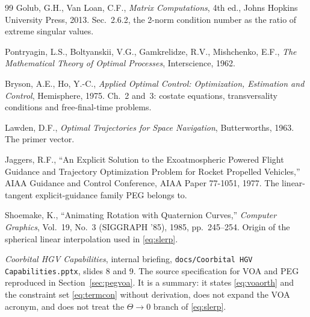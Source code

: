 \documentclass[11pt]{article}
\newcommand{\code}[1]{\texttt{#1}}
\begin{document}
\begin{thebibliography}{99}
Golub, G.H., Van Loan, C.F.,
\emph{Matrix Computations}, 4th ed., Johns Hopkins University Press, 2013.
Sec.~2.6.2, the 2-norm condition number as the ratio of extreme singular
values.

Pontryagin, L.S., Boltyanskii, V.G., Gamkrelidze, R.V., Mishchenko, E.F.,
\emph{The Mathematical Theory of Optimal Processes},
Interscience, 1962.

Bryson, A.E., Ho, Y.-C.,
\emph{Applied Optimal Control: Optimization, Estimation and Control},
Hemisphere, 1975. Ch.~2 and~3: costate equations, transversality conditions and
free-final-time problems.

Lawden, D.F.,
\emph{Optimal Trajectories for Space Navigation},
Butterworths, 1963. The primer vector.

Jaggers, R.F.,
``An Explicit Solution to the Exoatmospheric Powered Flight Guidance and
Trajectory Optimization Problem for Rocket Propelled Vehicles,''
AIAA Guidance and Control Conference, AIAA Paper 77-1051, 1977. The
linear-tangent explicit-guidance family PEG belongs to.

Shoemake, K.,
``Animating Rotation with Quaternion Curves,''
\emph{Computer Graphics}, Vol.~19, No.~3 (SIGGRAPH '85), 1985, pp.~245--254.
Origin of the spherical linear interpolation used in \eqref{eq:slerp}.

\emph{Coorbital HGV Capabilities}, internal briefing,
\code{docs/Coorbital HGV Capabilities.pptx}, slides 8 and 9. The source
specification for VOA and PEG reproduced in Section~\ref{sec:pegvoa}. It is a
summary: it states \eqref{eq:voaorth} and the constraint set
\eqref{eq:termcon} without derivation, does not expand the VOA acronym, and
does not treat the $\Theta\to0$ branch of \eqref{eq:slerp}.

\end{thebibliography}
\end{document}
